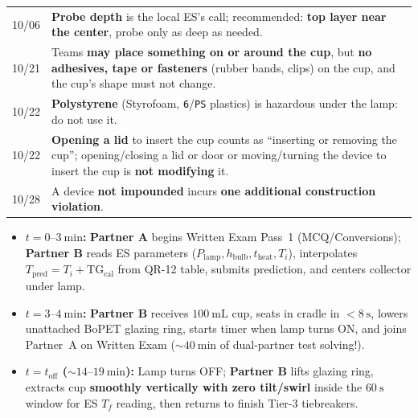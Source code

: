 \documentclass[10pt,twoside,openany,letterpaper]{book}
\begin{document}
\begin{quicksheet}
\begin{twocol}[0.51]
\begin{formulacard}
\begin{tabularx}{\linewidth}{@{}l X@{}}
10/06 & \textbf{Probe depth} is the local ES's call; recommended: \textbf{top layer near the center}, probe only as deep as needed. \\
10/21 & Teams \textbf{may place something on or around the cup}, but \textbf{no adhesives, tape or fasteners} (rubber bands, clips) on the cup, and the cup's shape must not change. \\
10/22 & \textbf{Polystyrene} (Styrofoam, \texttt{6}/\texttt{PS} plastics) is hazardous under the lamp: do not use it. \\
10/22 & \textbf{Opening a lid} to insert the cup counts as ``inserting or removing the cup''; opening/closing a lid or door or moving/turning the device to insert the cup is \textbf{not modifying} it. \\
10/28 & A device \textbf{not impounded} incurs \textbf{one additional construction violation}. \\
\bottomrule
\end{tabularx}
\end{formulacard}
\begin{shortcut}
\scriptsize
\begin{itemize}
  \item \textbf{$t = 0\text{--}\SI{3}{\minute}$:} \textbf{Partner A} begins Written Exam Pass~1 (MCQ/Conversions); \textbf{Partner B} reads ES parameters ($P_{\mathrm{lamp}}, h_{\mathrm{bulb}}, t_{\mathrm{heat}}, T_i$), interpolates $T_{\mathrm{pred}} = T_i + \mathrm{TG}_{\mathrm{cal}}$ from QR-12 table, submits prediction, and centers collector under lamp.
  \item \textbf{$t = 3\text{--}\SI{4}{\minute}$:} \textbf{Partner B} receives $\SI{100}{\milli\liter}$ cup, seats in cradle in $<\SI{8}{\second}$, lowers unattached BoPET glazing ring, starts timer when lamp turns ON, and joins Partner~A on Written Exam ($\sim\SI{40}{\minute}$ of dual-partner test solving!).
  \item \textbf{$t = t_{\mathrm{off}}$ ($\sim 14\text{--}\SI{19}{\minute}$):} Lamp turns OFF; \textbf{Partner B} lifts glazing ring, extracts cup \textbf{smoothly vertically with zero tilt/swirl} inside the $\SI{60}{\second}$ window for ES $T_f$ reading, then returns to finish Tier-3 tiebreakers.
\end{itemize}
\end{shortcut}
\end{twocol}


\end{quicksheet}
\end{document}
